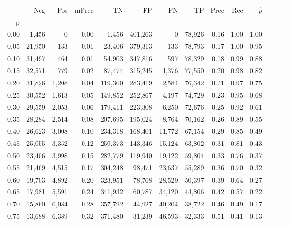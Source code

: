 \begin{tabular}{rrrrrrrrrrrrrr}
\toprule
{} &     Neg &    Pos & mPrec &       TN &       FP &      FN &      TP &  Prec &   Rec & $\hat{p}$ \\
p    &         &        &       &          &          &         &         &       &       &           \\
\midrule
0.00 &   1,456 &      0 &  0.00 &    1,456 &  401,263 &       0 &  78,926 &  0.16 &  1.00 &      1.00 \\
0.05 &  21,950 &    133 &  0.01 &   23,406 &  379,313 &     133 &  78,793 &  0.17 &  1.00 &      0.95 \\
0.10 &  31,497 &    464 &  0.01 &   54,903 &  347,816 &     597 &  78,329 &  0.18 &  0.99 &      0.88 \\
0.15 &  32,571 &    779 &  0.02 &   87,474 &  315,245 &   1,376 &  77,550 &  0.20 &  0.98 &      0.82 \\
0.20 &  31,826 &  1,208 &  0.04 &  119,300 &  283,419 &   2,584 &  76,342 &  0.21 &  0.97 &      0.75 \\
0.25 &  30,552 &  1,613 &  0.05 &  149,852 &  252,867 &   4,197 &  74,729 &  0.23 &  0.95 &      0.68 \\
0.30 &  29,559 &  2,053 &  0.06 &  179,411 &  223,308 &   6,250 &  72,676 &  0.25 &  0.92 &      0.61 \\
0.35 &  28,284 &  2,514 &  0.08 &  207,695 &  195,024 &   8,764 &  70,162 &  0.26 &  0.89 &      0.55 \\
0.40 &  26,623 &  3,008 &  0.10 &  234,318 &  168,401 &  11,772 &  67,154 &  0.29 &  0.85 &      0.49 \\
0.45 &  25,055 &  3,352 &  0.12 &  259,373 &  143,346 &  15,124 &  63,802 &  0.31 &  0.81 &      0.43 \\
0.50 &  23,406 &  3,998 &  0.15 &  282,779 &  119,940 &  19,122 &  59,804 &  0.33 &  0.76 &      0.37 \\
0.55 &  21,469 &  4,515 &  0.17 &  304,248 &   98,471 &  23,637 &  55,289 &  0.36 &  0.70 &      0.32 \\
0.60 &  19,703 &  4,892 &  0.20 &  323,951 &   78,768 &  28,529 &  50,397 &  0.39 &  0.64 &      0.27 \\
0.65 &  17,981 &  5,591 &  0.24 &  341,932 &   60,787 &  34,120 &  44,806 &  0.42 &  0.57 &      0.22 \\
0.70 &  15,860 &  6,084 &  0.28 &  357,792 &   44,927 &  40,204 &  38,722 &  0.46 &  0.49 &      0.17 \\
0.75 &  13,688 &  6,389 &  0.32 &  371,480 &   31,239 &  46,593 &  32,333 &  0.51 &  0.41 &      0.13 \\

\end{tabular}
